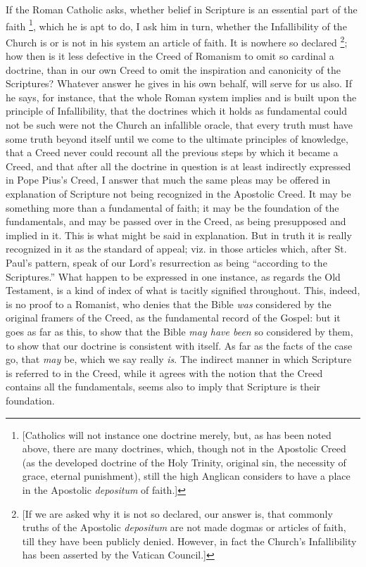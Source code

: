 If the Roman Catholic asks, whether belief in Scripture is an
essential part of the faith \footnote{[Catholics will not instance one doctrine merely, but, as has
been noted above, there are many doctrines, which, though not in the
Apostolic Creed (as the developed doctrine of the Holy Trinity,
original sin, the necessity of grace, eternal punishment), still the
high Anglican considers to have a place in the Apostolic \emph{depositum}
of faith.]},
which he is apt to do, I ask him in turn, whether the Infallibility of
the Church is or is not in his system an article of faith. It is
nowhere so declared \footnote{[If we are asked why it is not so declared,
our answer is, that commonly truths of the Apostolic \emph{depositum}
are not made dogmas or articles of faith, till they have been publicly
denied. However, in fact the Church's Infallibility has been asserted
by the Vatican Council.]}; how
then is it less defective in the Creed of Romanism to omit so cardinal
a doctrine, than in our own Creed to omit the inspiration and
canonicity of the Scriptures? Whatever answer he gives in his own
behalf, will serve for us also. If he says, for instance, that the
whole Roman system implies and is built upon the principle of
Infallibility, that the doctrines which it holds as fundamental could
not be such were not the Church an infallible oracle, that every truth
must have some truth beyond itself until we come to the ultimate
principles of knowledge, that a Creed never could recount all the
previous steps by which it became a Creed, and that after all the
doctrine in question is at least indirectly expressed in Pope Pius's
Creed, I answer that much the same pleas may be offered in explanation
of Scripture not being recognized in the Apostolic Creed. It may be
something more than a fundamental of faith; it may be the foundation
of the fundamentals, and may be passed over in the Creed, as being
presupposed and implied in it. This is what might be said in
explanation. But in truth it is really recognized in it as the
standard of appeal; viz. in those articles which, after St. Paul's
pattern, speak of our Lord's resurrection as being ``according to
the Scriptures.'' What happen to be expressed in one
instance, as regards the Old Testament, is a kind of index of what is
tacitly signified throughout. This, indeed, is no proof to a Romanist,
who denies that the Bible \emph{was} considered by the original
framers of the Creed, as the fundamental record of the Gospel: but it
goes as far as this, to show that the Bible \emph{may have been} so
considered by them, to show that our doctrine is consistent with
itself. As far as the facts of the case go, that \emph{may} be, which
we say really \emph{is}. The indirect manner in which Scripture is
referred to in the Creed, while it agrees with the notion that the
Creed contains all the fundamentals, seems also to imply that
Scripture is their foundation.

